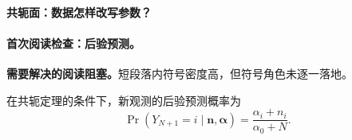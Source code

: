 \documentclass[UTF8,a4paper,11pt,openany]{ctexbook}
\begin{document}
\setcounter{page}{838}
\setcounter{chapter}{34}
\setcounter{section}{4}
\setcounter{figure}{6}
\setcounter{equation}{20}
\setcounter{proposition}{4}
\pagestyle{headings}

\FloatBarrier

\paragraph{共轭面：数据怎样改写参数？}

\paragraph{首次阅读检查：后验预测。}\textbf{需要解决的阅读阻塞。}短段落内符号密度高，但符号角色未逐一落地。

\begin{proposition}[后验预测]
在共轭定理的条件下，新观测的后验预测概率为
\[
\Pr(Y_{N+1}=i\mid\boldsymbol n,\boldsymbol\alpha)
=\frac{\alpha_i+n_i}{\alpha_0+N}.
\]
\end{proposition}
\end{document}
